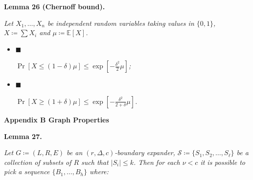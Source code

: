 \par\medskip\noindent\textbf{
\textbf{Lemma 26}\textbf{ }(Chernoff bound)\textbf{.}
}\par



\emph{Let $X_{1},\dots,X_{n}$ be independent random variables taking values in $\{0,1\}$, $X\coloneqq\sum X_{i}$ and $\mu\coloneqq\mathbb{E}[X]$.}\par


\begin{itemize}


\item[] 
$\blacksquare$ 


$\Pr[X\leq(1-\delta)\mu]\leq\exp\left[-\frac{\delta^{2}}{2}\mu\right]$\emph{;}\par





\item[] 
$\blacksquare$ 


$\Pr[X\geq(1+\delta)\mu]\leq\exp\left[-\frac{\delta^{2}}{2+\delta}\mu\right]$\emph{.}\par





\end{itemize}







\par\medskip\noindent\textbf{
Appendix B Graph Properties}\par





\par\medskip\noindent\textbf{
\textbf{Lemma 27}\textbf{.}
}\par



\emph{Let $G\coloneqq(L,R,E)$ be an $(r,\Delta,c)$-boundary expander, $\mathcal{S}\coloneqq\{S_{1},S_{2},\dots,S_{\ell}\}$ be a collection of subsets of $R$ such that $|S_{i}|\leq k$. Then for each $\nu<c$ it is possible to pick a sequence $\{B_{1},\dots,B_{h}\}$ where:}\par



